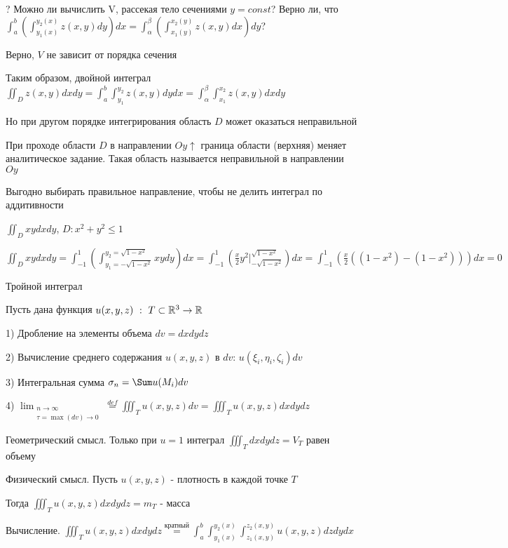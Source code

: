 \documentclass[12pt]{article}
\begin{document}
    ? Можно ли вычислить V, рассекая тело сечениями $y = const$? Верно ли, что $\int_a^b \left(\int_{y_1(x)}^{y_2(x)} z(x, y) dy\right) dx = \int_\alpha^\beta \left(\int_{x_1(y)}^{x_2(y)} z(x, y) dx\right) dy$?

    Верно, $V$ не зависит от порядка сечения

    Таким образом, двойной интеграл $\iint_D z(x, y) dxdy = \int_a^b \int_{y_1}^{y_2} z(x, y) dydx = \int_\alpha^\beta \int_{x_1}^{x_2} z(x, y) dxdy$

    Но при другом порядке интегрирования область $D$ может оказаться неправильной

    \Def При проходе области $D$ в направлении $Oy \uparrow$ граница области (верхняя) меняет аналитическое задание. Такая область называется неправильной в направлении $Oy$

    Выгодно выбирать правильное направление, чтобы не делить интеграл по аддитивности

    \Ex $\iint_D xy dx dy$, $D : x^2 + y^2 \leq 1$

    $\iint_D xy dx dy = \int_{-1}^1 \left(\int_{y_1 = -\sqrt{1-x^2}}^{y_2 = \sqrt{1-x^2}} xy dy\right) dx = \int_{-1}^1 \left(\frac{x}{2} y^2 \Big|_{-\sqrt{1-x^2}}^{\sqrt{1-x^2}}\right) dx =
    \int_{-1}^1 \left(\frac{x}{2} ((1 - x^2) - (1 - x^2))\right) dx = 0$

    \hypertarget{tripleintegral}{}

    \Def Тройной интеграл

    Пусть дана функция $u(x, y, z) \ : \ T \subset \mathbb{R}^3 \rightarrow \mathbb{R}$

    1) Дробление на элементы объема $dv = dxdydz$

    2) Вычисление среднего содержания $u(x, y, z)$ в $dv$: $u(\xi_i, \eta_i, \zeta_i) dv$

    3) Интегральная сумма $\sigma_n = \Sum u(M_i) dv$

    4) $\lim_{\substack{n \to \infty \\ \tau = \max (dv) \to 0}} \stackrel{def}{=} \iiint_T u(x, y, z) dv = \iiint_T u(x, y, z) dxdydz$

    Геометрический смысл. Только при $u = 1$ интеграл $\iiint_T dxdydz = V_T$ равен объему

    Физический смысл. Пусть $u(x, y, z)$ - плотность в каждой точке $T$

    Тогда $\iiint_T u(x, y, z) dxdydz = m_T$ - масса

    \hypertarget{tripleintegralcalculation}{}

    Вычисление. $\iiint_T u(x, y, z) dxdydz \stackrel{\text{кратный}}{=} \int^b_a \int_{y_1(x)}^{y_2(x)} \int_{z_1(x, y)}^{z_2(x, y)} u(x, y, z) dz dy dx$
\end{document}
